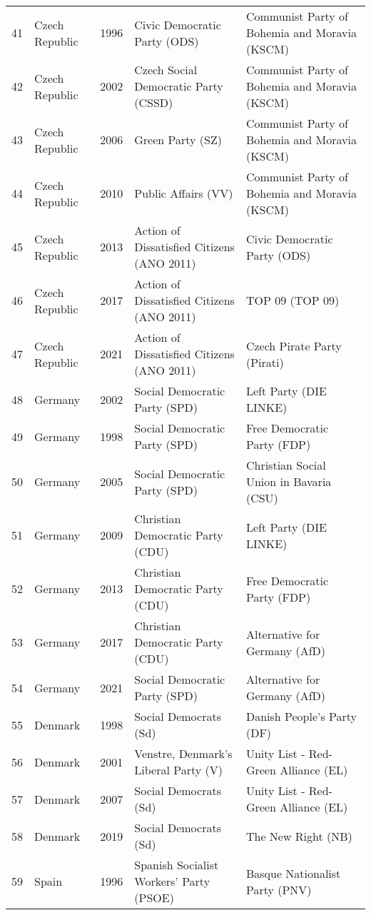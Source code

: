 \documentclass[12pt]{article}
\begin{document}
\begin{table}[ht]
\begin{footnotesize}
\begin{tabular}{rllll}
  41 & Czech Republic  & 1996 &   Civic Democratic Party (ODS) &   Communist Party of Bohemia and Moravia (KSCM) \\ 
  42 & Czech Republic  & 2002 &   Czech Social Democratic Party (CSSD) &   Communist Party of Bohemia and Moravia (KSCM) \\ 
  43 & Czech Republic & 2006 &   Green Party (SZ) &   Communist Party of Bohemia and Moravia (KSCM) \\ 
  44 & Czech Republic  & 2010 &   Public Affairs (VV) &   Communist Party of Bohemia and Moravia (KSCM) \\ 
  45 & Czech Republic  & 2013 &   Action of Dissatisfied Citizens (ANO 2011) &   Civic Democratic Party (ODS) \\ 
  46 & Czech Republic  & 2017 &   Action of Dissatisfied Citizens (ANO 2011) &   TOP 09 (TOP 09) \\ 
  47 & Czech Republic  & 2021 &   Action of Dissatisfied Citizens (ANO 2011) &   Czech Pirate Party (Pirati) \\ 
  48 & Germany & 2002 &   Social Democratic Party (SPD) &   Left Party (DIE LINKE) \\ 
  49 & Germany & 1998 &   Social Democratic Party (SPD) &   Free Democratic Party (FDP) \\ 
  50 & Germany & 2005 &   Social Democratic Party (SPD) &   Christian Social Union in Bavaria (CSU) \\ 
  51 & Germany & 2009 &   Christian Democratic Party (CDU) &   Left Party (DIE LINKE) \\ 
  52 & Germany & 2013 &   Christian Democratic Party (CDU) &   Free Democratic Party (FDP) \\ 
  53 & Germany & 2017 &   Christian Democratic Party (CDU) &   Alternative for Germany (AfD) \\ 
  54 & Germany & 2021 &   Social Democratic Party (SPD) &   Alternative for Germany (AfD) \\ 
  55 & Denmark & 1998 &   Social Democrats (Sd) &   Danish People's Party (DF) \\ 
  56 & Denmark & 2001 &   Venstre, Denmark's Liberal Party (V) &   Unity List - Red-Green Alliance (EL) \\ 
  57 & Denmark & 2007 &   Social Democrats (Sd) &   Unity List - Red-Green Alliance (EL) \\ 
  58 & Denmark & 2019 &   Social Democrats (Sd) &   The New Right (NB) \\ 
  59 & Spain & 1996 &   Spanish Socialist Workers' Party (PSOE) &   Basque Nationalist Party (PNV) \\ 

\end{tabular}
\end{footnotesize}
\end{table}
\end{document}
